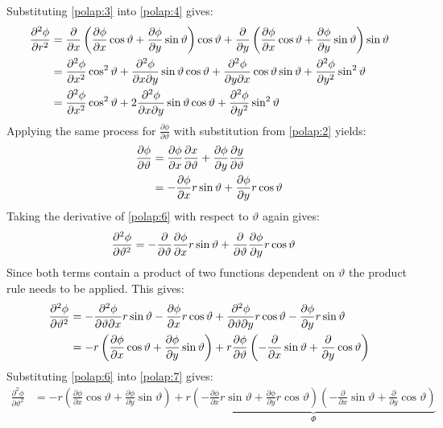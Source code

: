 \documentclass[a4paper,12pt]{article}
\renewcommand{\theta}{\vartheta}      		%
\newcommand{\partialder}[2]{\frac{\partial #1}{\partial #2}}        %
\begin{document}
Substituting \ref{polap:3} into \ref{polap:4} gives:
\begin{align}
	\notag\frac{\partial^2\phi}{\partial r^2}&=\partialder{}{x}\left(\partialder{\phi}{x}\cos\theta+\partialder{\phi}{y}\sin\theta\right)\cos\theta+\partialder{}{y}\left(\partialder{\phi}{x}\cos\theta+\partialder{\phi}{y}\sin\theta\right)\sin\theta\\
	\notag&=\frac{\partial^2\phi}{\partial x^2}\cos^2\theta+\frac{\partial^2\phi}{\partial x\partial y}\sin\theta\cos\theta+\frac{\partial^2\phi}{\partial y\partial x}\cos\theta\sin\theta+\frac{\partial^2\phi}{\partial y^2}\sin^2\theta\\
	\label{polap:5}&=\frac{\partial^2\phi}{\partial x^2}\cos^2\theta+2\frac{\partial^2\phi}{\partial x\partial y}\sin\theta\cos\theta+\frac{\partial^2\phi}{\partial y^2}\sin^2\theta
\end{align}
Applying the same process for $\partialder{\phi}{\theta}$ with substitution from \ref{polap:2} yields:
\begin{align}
	\notag\partialder{\phi}{\theta}&=\partialder{\phi}{x}\partialder{x}{\theta}+\partialder{\phi}{y}\partialder{y}{\theta}\\
	\label{polap:6}&=-\partialder{\phi}{x}r\sin\theta+\partialder{\phi}{y}r\cos\theta
\end{align}
Taking the derivative of \ref{polap:6} with respect to $\theta$ again gives:
\begin{align}
	\notag\frac{\partial^2\phi}{\partial\theta^2}&=-\partialder{}{\theta}\partialder{\phi}{x}r\sin\theta+\partialder{}{\theta}\partialder{\phi}{y}r\cos\theta
\end{align}
Since both terms contain a product of two functions dependent on $\theta$ the product rule needs to be applied. This gives:
\begin{align}
	\notag\frac{\partial^2\phi}{\partial\theta^2}&=-\frac{\partial^2\phi}{\partial\theta\partial x}r\sin\theta-\partialder{\phi}{x}r\cos\theta+\frac{\partial^2\phi}{\partial\theta\partial y}r\cos\theta-\partialder{\phi}{y}r\sin\theta\\
	\label{polap:7}&=-r\left(\partialder{\phi}{x}\cos\theta+\partialder{\phi}{y}\sin\theta\right)+r\partialder{\phi}{\theta}\left(-\partialder{}{x}\sin\theta+\partialder{}{y}\cos\theta\right)
\end{align}
Substituting \ref{polap:6} into \ref{polap:7} gives:
\begin{align}
	\label{polap:8}\frac{\partial^2\phi}{\partial\theta^2}&=-r\left(\partialder{\phi}{x}\cos\theta+\partialder{\phi}{y}\sin\theta\right)+r\underbrace{\left(-\partialder{\phi}{x}r\sin\theta+\partialder{\phi}{y}r\cos\theta\right)\left(-\partialder{}{x}\sin\theta+\partialder{}{y}\cos\theta\right)}_{\Phi}
\end{align}
\end{document}
